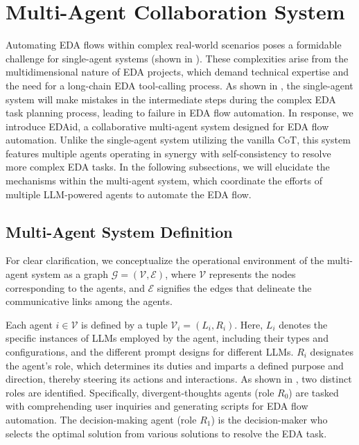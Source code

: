 \section{Multi-Agent Collaboration System}
\label{sec:multi-ChipAgent}

Automating EDA flows within complex real-world scenarios poses a formidable challenge for single-agent systems (shown in ). 
These complexities arise from the multidimensional nature of EDA projects, which demand technical expertise and the need for a long-chain EDA tool-calling process.
As shown in , the single-agent system will make mistakes in the intermediate steps during the complex EDA task planning process, leading to failure in EDA flow automation.
In response, we introduce EDAid, a collaborative multi-agent system designed for EDA flow automation. 
Unlike the single-agent system utilizing the vanilla CoT, this system features multiple agents operating in synergy with self-consistency to resolve more complex EDA tasks.
In the following subsections, we will elucidate the mechanisms within the multi-agent system, which coordinate the efforts of multiple LLM-powered agents to automate the EDA flow.

\subsection{Multi-Agent System Definition}
For clear clarification, we conceptualize the operational environment of the multi-agent system as a graph $\mathcal{G}=(\mathcal{V}, \mathcal{E})$, where $\mathcal{V}$ represents the nodes corresponding to the agents, and $\mathcal{E}$ signifies the edges that delineate the communicative links among the agents.

Each agent $i \in \mathcal{V}$ is defined by a tuple $\mathcal{V}_{i} = (L_{i}, R_{i})$. 
Here, $L_{i}$ denotes the specific instances of LLMs employed by the agent, including their types and configurations, and the different prompt designs for different LLMs. 
$R_{i}$ designates the agent's role, which determines its duties and imparts a defined purpose and direction, thereby steering its actions and interactions. 
As shown in , two distinct roles are identified.
Specifically, divergent-thoughts agents (role $R_{0}$) are tasked with comprehending user inquiries and generating scripts for EDA flow automation.
The decision-making agent (role $R_{1}$) is the decision-maker who selects the optimal solution from various solutions to resolve the EDA task.

